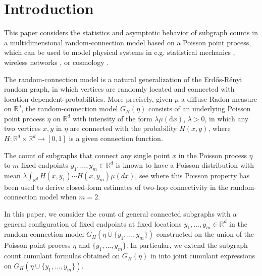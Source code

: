 \documentclass[12pt]{article}
\newcommand{\R}{\mathbb{R}}
\def\real{{\mathord{\mathbb R}}}
\numberwithin{equation}{section}
\begin{document}
\baselineskip0.7cm

\section{Introduction}
\noindent
This paper considers the statistics and asymptotic behavior of
subgraph counts in a multidimensional random-connection
model based on a Poisson point process, 
 which can be used to model physical systems in e.g.
 statistical mechanics 
 \cite{kartungiles2016}, 
 wireless networks
 \cite{ta2007,Mao2010,georgiou2015}, %
 or cosmology \cite{cunningham2017,fountoulakis2020}. 

 \medskip

 The random-connection model is a natural generalization of the %
 Erd\H os-R\'enyi random graph,
 in which vertices are randomly located and connected
 with location-dependent probabilities. 
 More precisely, given $\mu$ a %
 diffuse Radon measure on $\R^d$, the random-connection model $G_H (\eta )$
 consists of an underlying Poisson point process $\eta$ on $\R^d$
 with intensity of the form $\lambda \mu(\mathrm{d}x)$, $\lambda >0$,  
 in which any two vertices $x,y$ in $\eta $ are connected
 with the probability $H(x,y)$, 
 where $H:\real^d \times \real^d \to [0,1]$ is a given connection function. 
 
\medskip 

The count of subgraphs that connect any single point 
$x$ in the Poisson process $\eta$
to $m$ fixed endpoints $y_1,\ldots , y_m\in \real^d$
 is known to have a Poisson distribution with mean
$%
 \lambda \int_{\real^d} H(x,y_1)\cdots H(x,y_m)\mu (dx)$,
 see \cite{giles-privault2_published}
 where this Poisson property has been used
 to derive closed-form estimates of two-hop
 connectivity in the random-connection model
 when $m=2$. 

\medskip 
 
 In this paper, we consider the count of general connected
 subgraphs with a general configuration of
 fixed endpoints at fixed locations $y_1 , \ldots,y_m \in \R^d$ 
 in the random-connection model  
 $G_H (\eta \cup \{y_1, \ldots ,y_m\})$ constructed on the union
 of the Poisson point process $\eta$ and $\{ y_1, \ldots ,y_m\}$.
 In particular, we extend the subgraph count cumulant formulas obtained on 
 $G_H (\eta )$ in \cite{LiuPrivault} into joint cumulant expressions on
 $G_H (\eta \cup \{y_1, \ldots ,y_m\})$. 
 
\end{document}

